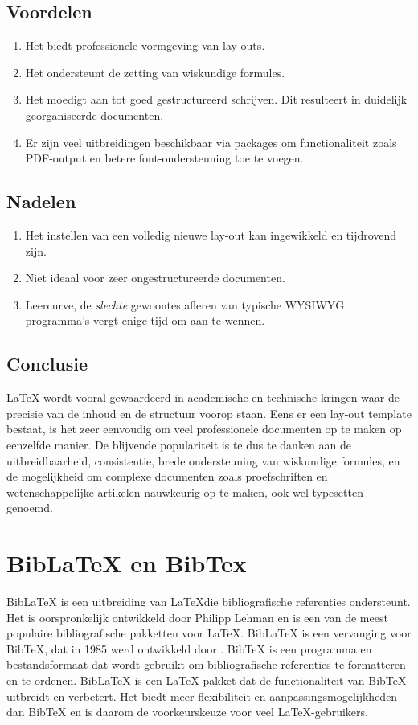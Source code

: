 \subsection{Voordelen}
\begin{enumerate}
    \item Het biedt professionele vormgeving van lay-outs.
    \item Het ondersteunt de zetting van wiskundige formules.
    \item Het moedigt aan tot goed gestructureerd schrijven. Dit resulteert in duidelijk georganiseerde documenten.
    \item Er zijn veel uitbreidingen beschikbaar via packages om functionaliteit zoals PDF-output en betere font-ondersteuning toe te voegen.
\end{enumerate}

\subsection{Nadelen}
\begin{enumerate}
    \item Het instellen van een volledig nieuwe lay-out kan ingewikkeld en tijdrovend zijn.
    \item Niet ideaal voor zeer ongestructureerde documenten.
    \item Leercurve, de \emph{slechte} gewoontes afleren van typische WYSIWYG programma's vergt enige tijd om aan te wennen.
\end{enumerate}

\subsection{Conclusie}
\LaTeX \autocite{Oetiker2023} wordt vooral gewaardeerd in academische en technische kringen waar de precisie van de inhoud en de structuur voorop staan. Eens er een lay-out template bestaat, is het zeer eenvoudig om veel professionele documenten op te maken op eenzelfde manier. 
De blijvende populariteit is te dus te danken aan de uitbreidbaarheid, consistentie, brede ondersteuning van wiskundige formules, en de mogelijkheid om complexe documenten zoals proefschriften en wetenschappelijke artikelen nauwkeurig op te maken, ook wel typesetten genoemd. 
 
\section{BibLaTeX en BibTex}
BibLaTeX is een uitbreiding van \LaTeX die bibliografische referenties ondersteunt. Het is oorspronkelijk ontwikkeld door Philipp Lehman \autocite{Kime2024} en is een van de meest populaire bibliografische pakketten voor \LaTeX. BibLaTeX is een vervanging voor BibTeX, dat in 1985 werd ontwikkeld door \textcite{Patashnik1988}. BibTeX is een programma en bestandsformaat dat wordt gebruikt om bibliografische referenties te formatteren en te ordenen. BibLaTeX is een \LaTeX-pakket dat de functionaliteit van BibTeX uitbreidt en verbetert. Het biedt meer flexibiliteit en aanpassingsmogelijkheden dan BibTeX en is daarom de voorkeurskeuze voor veel \LaTeX-gebruikers.

